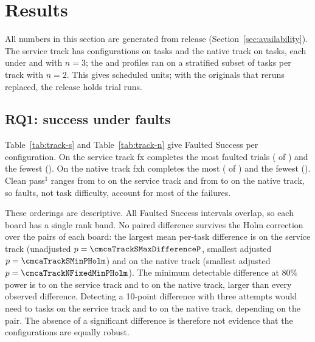 \section{Results}
\label{sec:results}

\ifcmcaresults
All numbers in this section are generated from release \cmcaRelease{} (Section~\ref{sec:availability}).
The service track has \cmcaTrackSConfigs{} configurations on \cmcaTrackSTasks{} tasks and the native track \cmcaTrackNFixedConfigs{} on \cmcaTrackNFixedTasks{} tasks, each under  and  with $n = 3$; the  and  profiles ran on a stratified subset of \cmcaTrackSCurveTasks{} tasks per track with $n = 2$.
This gives \cmcaUnits{} scheduled units; with the originals that reruns replaced, the release holds \cmcaTrialDirs{} trial runs.

\subsection{RQ1: success under faults}

Table~\ref{tab:track-s} and Table~\ref{tab:track-n} give Faulted Success per configuration.
On the service track fx completes the most faulted trials (\cmcaTrackSLeaderSucceeded{} of \cmcaTrackSLeaderSent{}) and \cmcaTrackSLast{} the fewest (\cmcaTrackSLastSucceeded{}).
On the native track fxh completes the most (\cmcaTrackNFixedLeaderSucceeded{} of \cmcaTrackNFixedLeaderSent{}) and \cmcaTrackNFixedLast{} the fewest (\cmcaTrackNFixedLastSucceeded{}).
Clean pass$^1$ ranges from \cmcaTrackSCleanMin{} to \cmcaTrackSCleanMax{} on the service track and from \cmcaTrackNFixedCleanMin{} to \cmcaTrackNFixedCleanMax{} on the native track, so faults, not task difficulty, account for most of the failures.

These orderings are descriptive.
All Faulted Success intervals overlap, so each board has a single rank band.
No paired difference survives the Holm correction over the \cmcaTrackSPairs{} pairs of each board: the largest mean per-task difference is \cmcaTrackSMaxDifference{} on the service track (unadjusted $p = \cmcaTrackSMaxDifferenceP$, smallest adjusted $p = \cmcaTrackSMinPHolm$) and \cmcaTrackNFixedMaxDifference{} on the native track (smallest adjusted $p = \cmcaTrackNFixedMinPHolm$).
The minimum detectable difference at 80\% power is \cmcaTrackSMddMin{} to \cmcaTrackSMddMax{} on the service track and \cmcaTrackNFixedMddMin{} to \cmcaTrackNFixedMddMax{} on the native track, larger than every observed difference.
Detecting a 10-point difference with three attempts would need \cmcaTrackSTasksNeededMin{} to \cmcaTrackSTasksNeededMax{} tasks on the service track and \cmcaTrackNFixedTasksNeededMin{} to \cmcaTrackNFixedTasksNeededMax{} on the native track, depending on the pair.
The absence of a significant difference is therefore not evidence that the configurations are equally robust.

